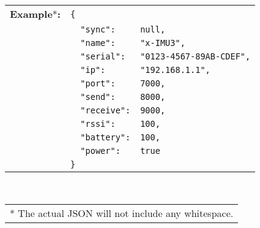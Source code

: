 \begin{table}[H]
    \begin{tabular}{l l l}
        \textbf{Example}*\textbf{:} & \texttt{\{} \\
        & \texttt{~~"sync":} & \texttt{null,} \\
        & \texttt{~~"name":} & \texttt{"x-IMU3",} \\
        & \texttt{~~"serial":} & \texttt{"0123-4567-89AB-CDEF",} \\
        & \texttt{~~"ip":} & \texttt{"192.168.1.1",} \\
        & \texttt{~~"port":} & \texttt{7000,} \\
        & \texttt{~~"send":} & \texttt{8000,} \\
        & \texttt{~~"receive":} & \texttt{9000,} \\
        & \texttt{~~"rssi":} & \texttt{100,} \\
        & \texttt{~~"battery":} & \texttt{100,} \\
        & \texttt{~~"power":} & \texttt{true} \\
        & \texttt{\}}
    \end{tabular} \\
    \begin{tabular}{l}
        \\
        \footnotesize{* The actual \acs{JSON} will not include any whitespace.}
    \end{tabular}
\end{table}
